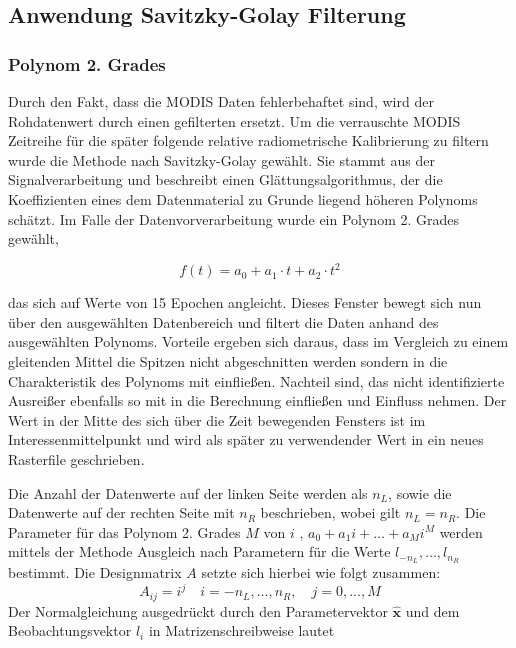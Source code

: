 \documentclass[11pt]{report}
\begin{document}
\subsection{Anwendung Savitzky-Golay Filterung}

\subsubsection{Polynom 2. Grades}
Durch den Fakt, dass die MODIS Daten fehlerbehaftet sind, wird der Rohdatenwert durch einen gefilterten ersetzt. Um die verrauschte MODIS Zeitreihe für die später folgende relative radiometrische Kalibrierung zu filtern wurde die Methode nach Savitzky-Golay gewählt. Sie stammt aus der Signalverarbeitung und beschreibt einen Glättungsalgorithmus, der die Koeffizienten eines dem Datenmaterial zu Grunde liegend höheren Polynoms schätzt. 
Im Falle der Datenvorverarbeitung wurde ein Polynom 2. Grades gewählt, 

\begin{equation}
\label{form_poly_2nd}
f(t) = a_0+a_1 \cdot t+a_2 \cdot t^2
\end{equation}

das sich auf Werte von 15 Epochen angleicht. Dieses Fenster bewegt sich nun über den ausgewählten Datenbereich und filtert die Daten anhand des ausgewählten Polynoms. Vorteile ergeben sich daraus, dass im Vergleich zu einem gleitenden Mittel die Spitzen nicht abgeschnitten werden sondern in die Charakteristik des Polynoms mit einfließen. Nachteil sind, das nicht identifizierte Ausreißer ebenfalls so mit in die Berechnung einfließen und Einfluss nehmen. Der Wert in der Mitte des sich über die Zeit bewegenden Fensters ist im Interessenmittelpunkt und wird als später zu verwendender Wert in ein neues Rasterfile geschrieben.

Die Anzahl der Datenwerte auf der linken Seite werden als $n_L$, sowie die Datenwerte auf der rechten Seite mit $n_R$ beschrieben, wobei gilt $n_L = n_R$.
Die Parameter für das Polynom 2. Grades $M$ von $i$ , $a_0+a_1i+\dots+a_Mi^M$ werden mittels der Methode Ausgleich nach Parametern für die Werte $l_{-n_L},\dots,l_{n_R}$ bestimmt. Die Designmatrix $A$ setzte sich hierbei wie folgt zusammen:
\begin{equation}
A_{ij} = i^j\quad i = -n_L, \dots, n_R,\quad j =0,\dots,M
\end{equation}
Der Normalgleichung ausgedrückt durch den Parametervektor $\widehat{\textbf{x}}$ und dem Beobachtungsvektor \textbf{$l_i$} in Matrizenschreibweise lautet
\end{document}
